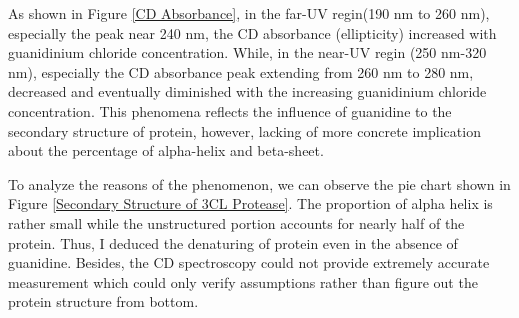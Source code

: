 \documentclass{report}
\begin{document}
As shown in Figure \ref{CD Absorbance}, in the far-UV regin(190 nm to 260 nm), especially the peak near 240 nm, the CD absorbance (ellipticity) increased with guanidinium chloride concentration.
While, in the near-UV regin (250 nm-320 nm), especially the CD absorbance peak extending from 260 nm to 280 nm, decreased and eventually diminished with the increasing guanidinium chloride concentration.
This phenomena reflects the influence of guanidine to the secondary structure of protein, however, lacking of more concrete implication about the percentage of alpha-helix and beta-sheet.



To analyze the reasons of the phenomenon, we can observe the pie chart shown in Figure \ref{Secondary Structure of 3CL Protease}.
The proportion of alpha helix is rather small while the unstructured portion accounts for nearly half of the protein.
Thus, I deduced the denaturing of protein even in the absence of guanidine.
Besides, the CD spectroscopy could not provide extremely accurate measurement which could only verify assumptions rather than figure out the protein structure from bottom.
\end{document}
